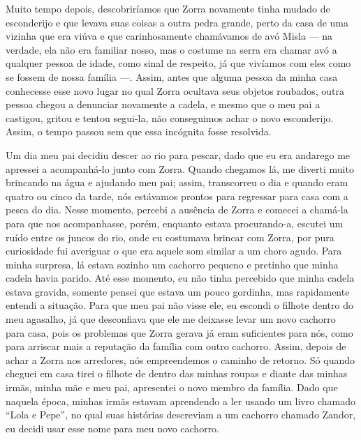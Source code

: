 Muito tempo depois, descobriríamos que Zorra novamente tinha mudado de esconderijo e que levava suas coisas a outra pedra grande, perto da casa de uma vizinha que era viúva e que carinhosamente chamávamos de avó Misla --- na verdade, ela não era familiar nosso, mas o costume na serra era chamar avó a qualquer pessoa de idade, como sinal de respeito, já que vivíamos com eles como se fossem de nossa família ---.
Assim, antes que alguma pessoa da minha casa conhecesse esse novo lugar no qual Zorra ocultava seus objetos roubados, outra pessoa chegou a denunciar novamente a cadela, e mesmo que o meu pai a castigou, gritou e tentou segui-la, não conseguimos achar o novo esconderijo. Assim, o tempo passou sem que essa incógnita fosse resolvida. 

Um dia meu pai decidiu descer ao rio para pescar, dado que eu era andarego me apressei a acompanhá-lo junto com Zorra. 
Quando chegamos lá, me diverti muito brincando na água e ajudando meu pai; assim, transcorreu o dia e quando eram quatro ou cinco da tarde, nós estávamos prontos para regressar para casa com a pesca do dia.
Nesse momento, percebi a ausência de Zorra e comecei a chamá-la para que nos acompanhasse,
porém, enquanto estava procurando-a, escutei um ruído entre os juncos do rio, onde eu costumava brincar com Zorra, por pura curiosidade fui averiguar o que era aquele som similar a um choro agudo. Para minha surpresa, lá estava sozinho um cachorro pequeno e pretinho que minha cadela havia parido.  
Até esse momento, eu não tinha percebido que minha cadela estava gravida, somente pensei que estava um pouco gordinha,
mas rapidamente entendi a situação.
Para que meu pai não visse ele, eu escondi o filhote dentro do meu agasalho, já que desconfiava que ele me deixasse levar um novo cachorro para casa, pois os problemas que Zorra gerava já eram suficientes para nós, como para arriscar mais a reputação da família com outro cachorro.
Assim, depois de achar a Zorra nos arredores, nós empreendemos o caminho de retorno.
Só quando cheguei em casa tirei o filhote de dentro das minhas roupas e diante das minhas irmãs, minha mãe e meu pai, apresentei o novo membro da família. Dado que naquela época, minhas irmãs estavam aprendendo a ler usando um livro chamado ``Lola e Pepe'', no qual suas histórias descreviam a um cachorro chamado Zandor, eu decidi usar esse nome para meu novo cachorro. 

